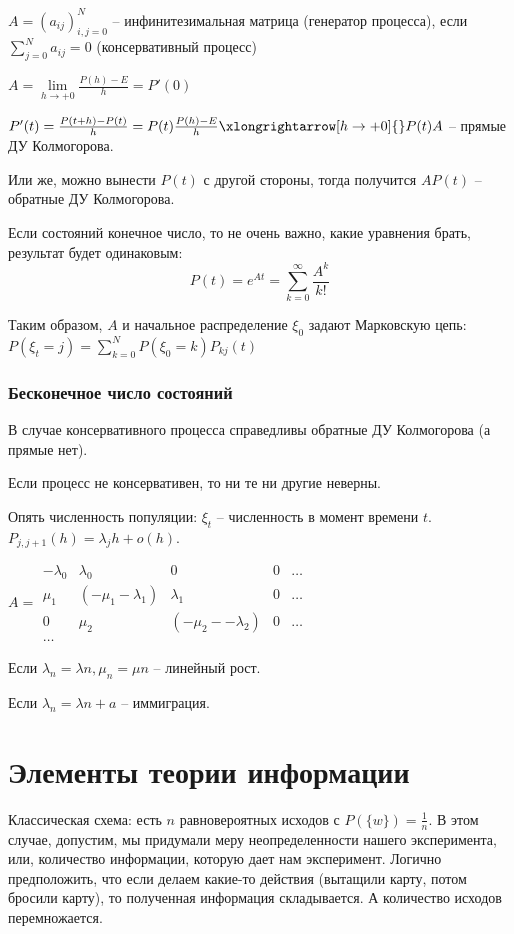 \begin{Def}
$A = (a_{ij})_{i,j=0}^N$ -- инфинитезимальная матрица (генератор процесса), если $\sum\limits_{j=0}^N a_{ij} = 0$ (консервативный процесс)
\end{Def}

$A = \lim\limits_{h \to +0} \frac{P(h) - E}{h} = P'(0)$

$P'(t) = \frac{P(t+h) - P(t)}{h} = P(t) \frac{P(h) - E}{h} \xlongrightarrow[h \to +0]{} P(t) A$ -- прямые ДУ Колмогорова.

Или же, можно вынести $P(t)$ с другой стороны, тогда получится $AP(t)$ -- обратные ДУ Колмогорова.

Если состояний конечное число, то не очень важно, какие уравнения брать, результат будет одинаковым: 
$$P(t) = e^{At} = \sum\limits_{k = 0}^\infty \frac{A^k}{k!}$$

Таким образом, $A$ и начальное распределение $\xi_0$ задают Марковскую цепь: $P(\xi_t = j) = \sum\limits_{k=0}^N P(\xi_0 = k) P_{kj}(t)$

\subsection{Бесконечное число состояний}
В случае консервативного процесса справедливы обратные ДУ Колмогорова (а прямые нет).

Если процесс не консервативен, то ни те ни другие неверны.

\begin{exmp}
Опять численность популяции: $\xi_t$ -- численность в момент времени $t$. $P_{j,j+1}(h) = \lambda_jh + o(h)$.

$A = \begin{matrix}
-\lambda_0 & \lambda_0 & 0 & 0 & \dots \\
\mu_1 & (-\mu_1 - \lambda_1) & \lambda_1 & 0 & \dots \\
0 & \mu_2 & (-\mu_2 - -\lambda_2) & 0 & \dots \\
\dots
\end{matrix}$

Если $\lambda_n = \lambda n, \mu_n = \mu n$ -- линейный рост.

Если $\lambda_n = \lambda n + a$ -- иммиграция.
\end{exmp}


\chapter{Элементы теории информации}
Классическая схема: есть $n$ равновероятных исходов с $P(\{w\}) = \frac1n$.
В этом случае, допустим, мы придумали меру неопределенности нашего эксперимента, или, количество информации, которую дает нам эксперимент.
Логично предположить, что если делаем какие-то действия (вытащили карту, потом бросили карту), то полученная информация складывается.
А количество исходов перемножается.

